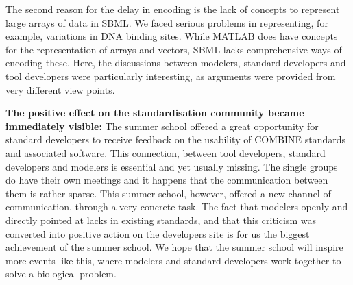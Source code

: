 \documentclass[journal,transmag]{IEEEtran}
\begin{document}
The second reason for the delay in encoding is the lack of concepts to represent large arrays of data in SBML. 
We faced serious problems in representing, for example, variations in DNA binding sites. 
While MATLAB does have concepts for the representation of arrays and vectors, SBML lacks comprehensive ways of encoding these. 
Here, the discussions between modelers, standard developers and tool developers were particularly interesting, as arguments were provided from very different view points.

\textbf{The positive effect on the standardisation community became immediately visible:} 
The summer school offered a great opportunity for standard developers to receive feedback on the usability of COMBINE standards and associated software. 
This connection, between tool developers, standard developers and modelers is essential and yet usually missing. 
The single groups do have their own meetings and it happens that the communication between them is rather sparse. 
This summer school, however, offered a new channel of communication, through a very concrete task. 
The fact that modelers openly and directly pointed at lacks in existing standards, and that this criticism was converted into positive action on the developers site is for
us the biggest achievement of the summer school. 
We hope that the summer school will inspire more events like this, where modelers and standard developers work together to solve a biological problem.
\end{document}
